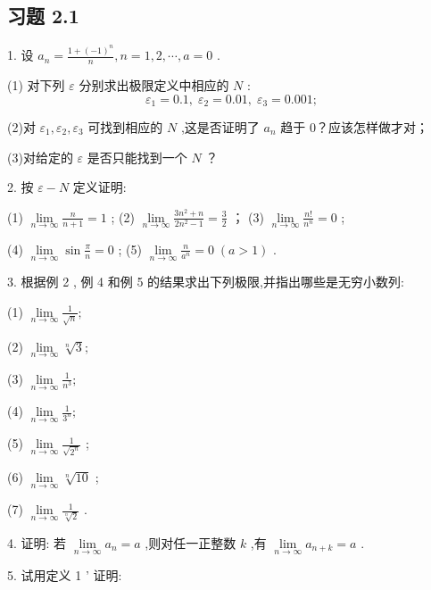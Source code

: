 \subsection{习题 2.1}

1. 设 \({a}_{n} = \frac{1 + {\left( -1\right) }^{n}}{n},n = 1,2,\cdots ,a = 0\) .

(1) 对下列 \(\varepsilon\) 分别求出极限定义中相应的 \(N\) :
\[
{\varepsilon }_{1} = {0.1},\;{\varepsilon }_{2} = {0.01},\;{\varepsilon }_{3} = {0.001};
\]

(2)对 \({\varepsilon }_{1},{\varepsilon }_{2},{\varepsilon }_{3}\) 可找到相应的 \(N\) ,这是否证明了 \({a}_{n}\) 趋于 0？应该怎样做才对；

(3)对给定的 \(\varepsilon\) 是否只能找到一个 \(N\) ？

2. 按 \(\varepsilon  - N\) 定义证明:

(1) \(\mathop{\lim }\limits_{{n \rightarrow  \infty }}\frac{n}{n + 1} = 1\) ; (2) \(\mathop{\lim }\limits_{{n \rightarrow  \infty }}\frac{3{n}^{2} + n}{2{n}^{2} - 1} = \frac{3}{2}\) ； (3) \(\mathop{\lim }\limits_{{n \rightarrow  \infty }}\frac{n!}{{n}^{n}} = 0\) ;

(4) \(\mathop{\lim }\limits_{{n \rightarrow  \infty }}\sin \frac{\pi }{n} = 0\) ; (5) \(\mathop{\lim }\limits_{{n \rightarrow  \infty }}\frac{n}{{a}^{n}} = 0\;\left( {a > 1}\right)\) .

3. 根据例 2 , 例 4 和例 5 的结果求出下列极限,并指出哪些是无穷小数列:

(1) \(\mathop{\lim }\limits_{{n \rightarrow  \infty }}\frac{1}{\sqrt{n}};\)

(2) \(\mathop{\lim }\limits_{{n \rightarrow  \infty }}\sqrt[n]{3};\)

(3) \(\mathop{\lim }\limits_{{n \rightarrow  \infty }}\frac{1}{{n}^{3}};\)

(4) \(\mathop{\lim }\limits_{{n \rightarrow  \infty }}\frac{1}{{3}^{n}};\)

(5) \(\mathop{\lim }\limits_{{n \rightarrow  \infty }}\frac{1}{\sqrt{{2}^{n}}}\) ;

(6) \(\mathop{\lim }\limits_{{n \rightarrow  \infty }}\sqrt[n]{10}\) ;

(7) \(\mathop{\lim }\limits_{{n \rightarrow  \infty }}\frac{1}{\sqrt[n]{2}}\) .

4. 证明: 若 \(\mathop{\lim }\limits_{{n \rightarrow  \infty }}{a}_{n} = a\) ,则对任一正整数 \(k\) ,有 \(\mathop{\lim }\limits_{{n \rightarrow  \infty }}{a}_{n + k} = a\) .

5. 试用定义 1 ’ 证明:


